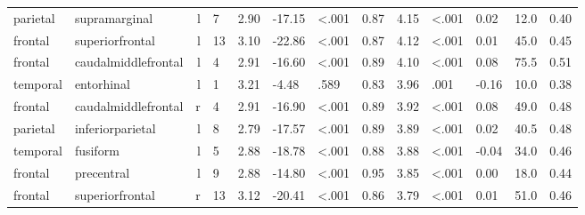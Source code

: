\documentclass{article}
\begin{document}
\begin{longtable}{llrR{1.5cm}R{1cm}R{1.3cm}R{1cm}R{1cm}R{1.3cm}R{1cm}R{1.8cm}R{1.3cm}R{1.8cm}}
  parietal &             supramarginal &    l &            7 &                  2.90 &           -17.15 &      \textless.001 &                               0.87 &                          4.15 &                   \textless.001 &  0.02 &   12.0 &      0.40 \\
   frontal &           superiorfrontal &    l &           13 &                  3.10 &           -22.86 &      \textless.001 &                               0.87 &                          4.12 &                   \textless.001 &  0.01 &   45.0 &      0.45 \\
   frontal &       caudalmiddlefrontal &    l &            4 &                  2.91 &           -16.60 &      \textless.001 &                               0.89 &                          4.10 &                   \textless.001 &  0.08 &   75.5 &      0.51 \\
  temporal &                entorhinal &    l &            1 &                  3.21 &            -4.48 &               .589 &                               0.83 &                          3.96 &                            .001 & -0.16 &   10.0 &      0.38 \\
   frontal &       caudalmiddlefrontal &    r &            4 &                  2.91 &           -16.90 &      \textless.001 &                               0.89 &                          3.92 &                   \textless.001 &  0.08 &   49.0 &      0.48 \\
  parietal &          inferiorparietal &    l &            8 &                  2.79 &           -17.57 &      \textless.001 &                               0.89 &                          3.89 &                   \textless.001 &  0.02 &   40.5 &      0.48 \\
  temporal &                  fusiform &    l &            5 &                  2.88 &           -18.78 &      \textless.001 &                               0.88 &                          3.88 &                   \textless.001 & -0.04 &   34.0 &      0.46 \\
   frontal &                precentral &    l &            9 &                  2.88 &           -14.80 &      \textless.001 &                               0.95 &                          3.85 &                   \textless.001 &  0.00 &   18.0 &      0.44 \\
   frontal &           superiorfrontal &    r &           13 &                  3.12 &           -20.41 &      \textless.001 &                               0.86 &                          3.79 &                   \textless.001 &  0.01 &   51.0 &      0.46 \\

\end{longtable}
\end{document}
